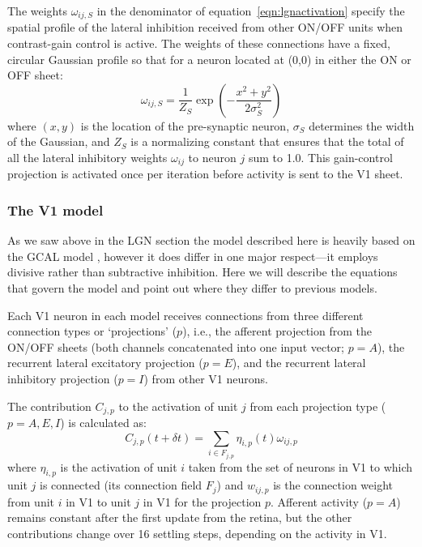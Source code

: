 The weights $\omega_{ij, S}$ in the denominator of
equation~\ref{eqn:lgnactivation} specify the spatial profile of the
lateral inhibition received from other ON/OFF units when contrast-gain
control is active. The weights of these connections have a fixed,
circular Gaussian profile so that for a neuron located at (0,0) in
either the ON or OFF sheet:
\begin{equation}
\omega_{ij,S}=\frac{1}{Z_S}\exp\left(-\frac{x^{2}+y^{2}}{2\sigma_{S}^{2}}\right)
\label{eqn:gauss}
\end{equation}
where $(x, y)$ is the location of the pre-synaptic neuron, $\sigma_{S}$
determines the width of the Gaussian, and $Z_S$ is a normalizing
constant that ensures that the total of all the lateral inhibitory
weights $\omega_{ij}$ to neuron $j$ sum to 1.0. This gain-control
projection is activated once per iteration before activity is sent to
the V1 sheet.

\subsubsection{The V1 model}

As we saw above in the LGN section the model described here is heavily
based on the GCAL model \citep{Stevens2013}, however it does differ in
one major respect---it employs divisive rather than subtractive
inhibition. Here we will describe the equations that govern the model
and point out where they differ to previous models.

Each V1 neuron in each model receives connections from three different
connection types or `projections' ($p$), i.e., the afferent projection
from the ON/OFF sheets (both channels concatenated into one input
vector; $p=A$), the recurrent lateral excitatory projection ($p=E$),
and the recurrent lateral inhibitory projection ($p=I$) from other V1
neurons.

The contribution $C_{j,p}$ to the activation of unit $j$ from each
projection type ($p=A,E,I$) is calculated as:
\begin{equation}
C_{j,p}(t+\delta t)=\sum_{i\in F_{j,p}}\eta_{i, p}(t)\omega_{ij,p}
\label{eqn:update}
\end{equation}
where $\eta_{i, p}$ is the activation of unit $i$ taken from the set
of neurons in V1 to which unit $j$ is connected (its connection field
$F_j$) and $w_{ij,p}$ is the connection weight from unit $i$ in V1 to
unit $j$ in V1 for the projection $p$. Afferent activity ($p=A$)
remains constant after the first update from the retina, but the other
contributions change over 16 settling steps, depending on the activity
in V1.

